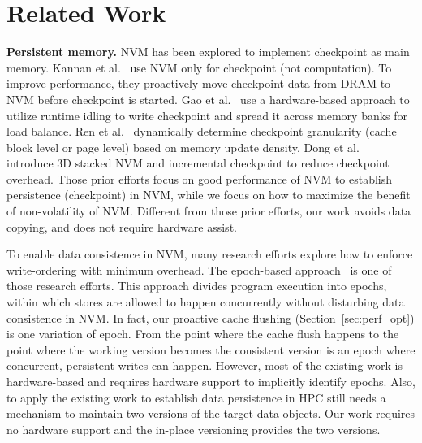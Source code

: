 \section{Related Work}
\label{sec:related_work}
\begin{spacing}{0.9}
\textbf{Persistent memory.}
NVM has been explored to implement checkpoint as main memory.
Kannan et al.~\cite{ipdps13:kannan} use NVM only for checkpoint (not computation). To improve performance, they proactively move checkpoint data from DRAM to NVM before checkpoint is started. 
Gao et al.~\cite{ics15:gao} use a hardware-based approach to utilize runtime idling to write checkpoint and spread it across memory banks for load balance.
Ren et al.~\cite{micro15:ren} dynamically determine checkpoint granularity (cache block level or page level) based on memory update density.
Dong et al.~\cite{sc09:dong} introduce 3D stacked NVM and incremental
checkpoint to reduce checkpoint overhead.
Those prior efforts focus on good performance of NVM to establish persistence (checkpoint) in NVM, while we focus on how to maximize the benefit of non-volatility of NVM. Different from those prior efforts, our work avoids data copying, %
and does not require hardware assist.

To enable data consistence in NVM, many research efforts explore how to enforce write-ordering with minimum overhead. The epoch-based approach~\cite{sosp09:condit, Pelley:isca14, micro15:joshi, micro16:kolli} is one of those research efforts. This approach divides program execution into epochs, within which stores are allowed to happen concurrently without disturbing data consistence in NVM.
In fact, our proactive cache flushing (Section~\ref{sec:perf_opt}) is one variation of epoch. 
From the point where the cache flush happens to the point where the working version becomes the consistent version is an epoch where concurrent, persistent writes can happen.
However, most of the existing work is hardware-based and requires hardware support to implicitly identify epochs. Also, to apply the existing work to establish data persistence in HPC still needs a mechanism to maintain two versions of the target data objects. Our work requires no hardware support and the in-place versioning provides the two versions.


\end{spacing}
